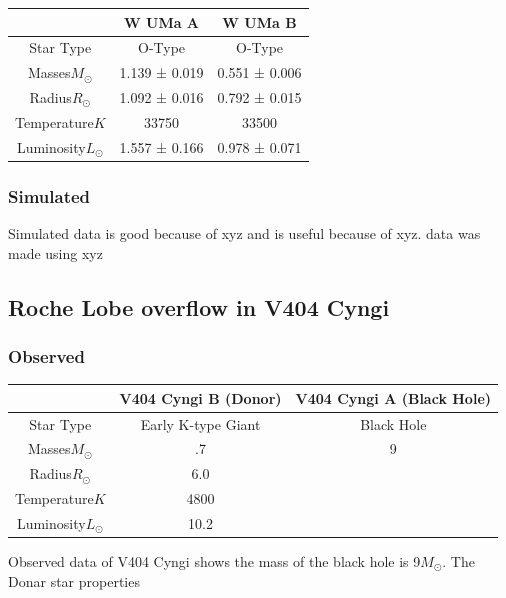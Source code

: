 \documentclass[12pt, letterpaper]{article}
\begin{document}
        \begin{center}
            \begin{tabular}{||c c c||} 
             \hline
             & W UMa A & W UMa B \\ 
             \hline\hline
             Star Type & O-Type \cite{Antokhina_2011} & O-Type \cite{Antokhina_2011} \\ 
             \hline
             Masses\(M_\odot\) & 1.139 ± 0.019\cite{10.1093/mnras/staa3753} & 0.551 ± 0.006\cite{10.1093/mnras/staa3753} \\
             \hline
             Radius\(R_\odot\) & 1.092 ± 0.016\cite{10.1093/mnras/staa3753} & 0.792 ± 0.015\cite{10.1093/mnras/staa3753} \\
             \hline
             Temperature$K$ & 33750 \cite{Antokhina_2011}  & 33500 \cite{Antokhina_2011} \\
             \hline
             Luminosity\(L_\odot\) & 1.557 ± 0.166\cite{10.1093/mnras/staa3753} & 0.978 ± 0.071\cite{10.1093/mnras/staa3753}   \\ 
             \hline
            \end{tabular}
        \end{center}
        
        \subsubsection{Simulated}
        Simulated data is good because of xyz and is useful because of xyz. data was made using xyz

    \subsection{\centering Roche Lobe overflow in V404 Cyngi}
        \subsubsection{Observed}
        \begin{center}
            \begin{tabular}{||c c c||} 
             \hline
             & V404 Cyngi B (Donor) & V404 Cyngi A (Black Hole) \\ 
             \hline\hline
             Star Type & Early K-type Giant & Black Hole \\ 
             \hline
             Masses\(M_\odot\) & .7 \cite{Bernardini_2016} & 9 \cite{10.1093/mnras/271.1.L10} \\
             \hline
             Radius\(R_\odot\) & 6.0 \cite{10.1093/mnras/271.1.L10} &  \\
             \hline
             Temperature$K$ & 4800 \cite{10.1093/mnras/271.1.L10} & \\
             \hline
             Luminosity\(L_\odot\) & 10.2 \cite{10.1093/mnras/271.1.L10} &  \\ 
             \hline
        \end{tabular} 
        \end{center}
         Observed data of V404 Cyngi shows the mass of the black hole is 9\(M_\odot\). The Donar star properties 
\end{document}
